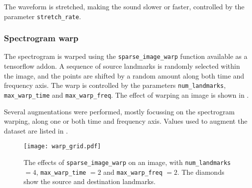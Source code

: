 The waveform is stretched, making the sound slower or faster, controlled by the
parameter \texttt{stretch\_rate}.

\subsubsection{Spectrogram warp}

The spectrogram is warped using the \texttt{sparse\_image\_warp} function
available as a tensorflow addon.
A sequence of source landmarks is randomly selected within the image, and the
points are shifted by a random amount along both time and frequency axis. The
warp is controlled by the parameters \texttt{num\_landmarks},
\texttt{max\_warp\_time} and \texttt{max\_warp\_freq}.
The effect of warping an image is shown in .

Several augmentations were performed, mostly focussing on the spectrogram
warping, along one or both time and frequency axis.
Values used to augment the dataset are listed in .

\begin{figure}[t!]
    \centering
    \texttt{[image: warp\_grid.pdf]}
    \caption{
    The effects of \texttt{sparse\_image\_warp} on an image, with
\texttt{num\_landmarks} $=4$, \texttt{max\_warp\_time} $=2$ and
\texttt{max\_warp\_freq} $=2$. The diamonds show the source and destination
landmarks.}%
    \label{fig:warp_grid}
\end{figure}

